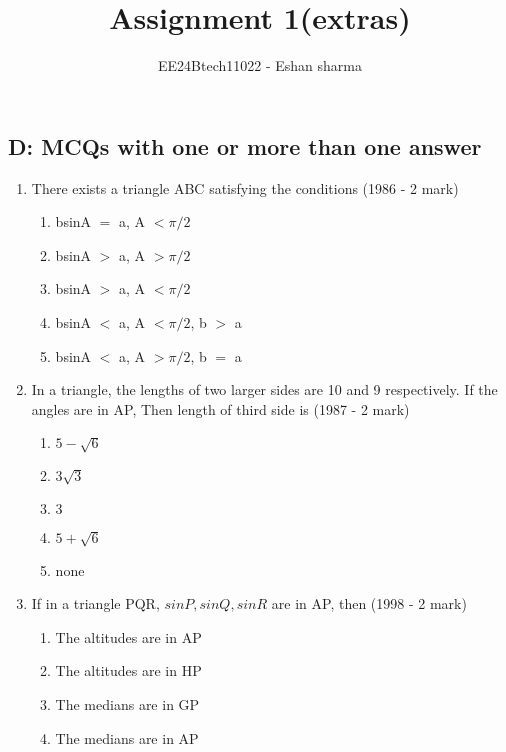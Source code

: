 \documentclass[journal,12pt,twocolumn]{IEEEtran}
\theoremstyle{remark}
\begin{document}

\vspace{3cm}

\title{Assignment 1(extras)}
\author{EE24Btech11022 - Eshan sharma}
\maketitle
\newpage
\bigskip

\renewcommand{\thefigure}{\theenumi}
\renewcommand{\thetable}{\theenumi}


\subsection*{D: MCQs with one or more than one answer}
\begin{enumerate}[label=\arabic*.]
    \item There exists a triangle ABC satisfying the conditions
    \hfill{(1986 - 2 mark)}
    \begin{enumerate}[label=(\alph*)]
    \item bsinA $=$ a, A $<\pi/2$
    \item bsinA $>$ a, A $>\pi/2$
    \item bsinA $>$ a, A $<\pi/2$
    \item bsinA $<$ a, A $<\pi/2$, b $>$ a
    \item bsinA $<$ a, A $>\pi/2$, b $=$ a
    \end{enumerate}
    \item In a triangle, the lengths of two larger sides are 10 and 9 respectively. If the angles are in AP, Then length of third side is
    \hfill{(1987 - 2 mark)}
    \begin{enumerate}[label=(\alph*)]
    \item $5-\sqrt{6}$ 
    \item $3\sqrt{3}$
    \item $3$
    \item $5+\sqrt{6}$ 
    \item none
    \end{enumerate}
    \item If in a triangle PQR, $sinP, sinQ, sinR$ are in AP, then
    \hfill{(1998 - 2 mark)}
    \begin{enumerate}[label=(\alph*)]
    \item The altitudes are in AP
    \item The altitudes are in HP
    \item The medians are in GP
    \item The medians are in AP

\end{enumerate}
\end{enumerate}
\end{document}
